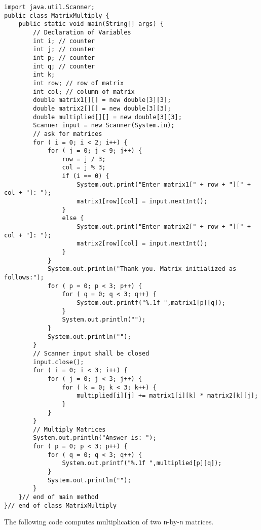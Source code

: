 \documentclass[12pt,letterpaper,twoside]{article}
\begin{document}
\lstset{language=Java,tabsize=2}
\begin{lstlisting}
import java.util.Scanner;
public class MatrixMultiply {
	public static void main(String[] args) {
		// Declaration of Variables
		int i; // counter
		int j; // counter
		int p; // counter
		int q; // counter
		int k;
		int row; // row of matrix
		int col; // column of matrix
		double matrix1[][] = new double[3][3];
		double matrix2[][] = new double[3][3];
		double multiplied[][] = new double[3][3];
		Scanner input = new Scanner(System.in);
		// ask for matrices
		for ( i = 0; i < 2; i++) {
			for ( j = 0; j < 9; j++) {
				row = j / 3;
				col = j % 3;
				if (i == 0) {
					System.out.print("Enter matrix1[" + row + "][" + col + "]: ");
					matrix1[row][col] = input.nextInt();
				}
				else {
					System.out.print("Enter matrix2[" + row + "][" + col + "]: ");
					matrix2[row][col] = input.nextInt();
				}
			}
			System.out.println("Thank you. Matrix initialized as follows:");
			for ( p = 0; p < 3; p++) {
				for ( q = 0; q < 3; q++) {
					System.out.printf("%.1f ",matrix1[p][q]);
				}
				System.out.println("");
			}
			System.out.println("");
		}
		// Scanner input shall be closed
		input.close();
		for ( i = 0; i < 3; i++) {
			for ( j = 0; j < 3; j++) {
				for ( k = 0; k < 3; k++) {
					multiplied[i][j] += matrix1[i][k] * matrix2[k][j];
				}
			}
		}
		// Multiply Matrices
		System.out.println("Answer is: ");
		for ( p = 0; p < 3; p++) {
			for ( q = 0; q < 3; q++) {
				System.out.printf("%.1f ",multiplied[p][q]);
			}
			System.out.println("");
		}
	}// end of main method
}// end of class MatrixMultiply
\end{lstlisting}

The following code computes multiplication of two \texttt{n}-by-\texttt{n} matrices.
\end{document}
